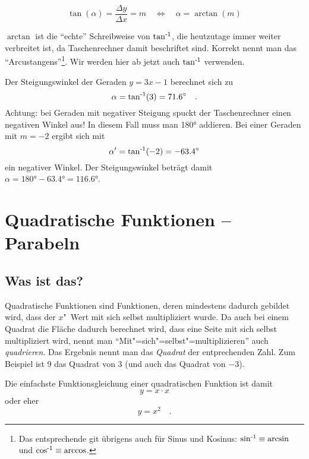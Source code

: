 \documentclass[load-fonts,babel=ngerman]{arbeitsblatt}
\begin{document}
\begin{equation}
  \label{eq:steigungswinkel}
  \tan(\alpha) = \frac{\Delta y}{\Delta x} = m
  \quad \Leftrightarrow \quad
  \alpha = \arctan(m)
\end{equation}

$\arctan$ ist die "`echte"' Schreibweise von $\operatorname{tan^{-1}}$, die heutzutage immer
weiter verbreitet ist, da Taschenrechner damit beschriftet sind.  Korrekt
nennt man das "`Arcustangens"'\footnote{Das entsprechende git übrigens auch
  für Sinus und Kosinus: $\operatorname{sin^{-1}}\equiv\arcsin$ und $\operatorname{cos^{-1}}\equiv\arccos$.}.  Wir
werden hier ab jetzt auch $\operatorname{tan^{-1}}$ verwenden.

\begin{beispiel}\label{bsp:steigungswinkel}
  Der Steigungswinkel der Geraden $y=3x-1$ berechnet sich zu
  \begin{equation*}
    \alpha = \operatorname{tan^{-1}}(3) = \ang{71.6} \quad.
  \end{equation*}
  Achtung: bei Geraden mit negativer Steigung spuckt der Taschenrechner einen
  negativen Winkel aus!  In diesem Fall muss man \ang{180} addieren.  Bei
  einer Geraden mit $m=-2$ ergibt sich mit
  \begin{equation*}
    \alpha' = \operatorname{tan^{-1}}(-2) = \ang{-63.4}
  \end{equation*}
  ein negativer Winkel.  Der Steigungswinkel beträgt damit $\alpha=\ang{180} -
  \ang{63.4} = \ang{116.6}$.
\end{beispiel}

\section{Quadratische Funktionen -- Parabeln}\label{sec:quadr-funkt-parab}
\subsection{Was ist das?}
Quadratische Funktionen sind Funktionen, deren 
mindestens dadurch gebildet wird, dass der $x$"~Wert mit sich selbst
multipliziert wurde.  Da auch bei einem Quadrat die Fläche dadurch berechnet
wird, dass eine Seite mit sich selbst multipliziert wird, nennt man
"`Mit"=sich"=selbst"=multiplizieren"' auch \emph{quadrieren}.  Das Ergebnis
nennt man das \emph{Quadrat} der entprechenden Zahl.  Zum Beispiel ist \num{9}
das Quadrat von \num{3} (und auch das Quadrat von \num{-3}).

Die einfachste Funktionsgleichung einer quadratischen Funktion ist damit
\begin{equation}
  \label{eq:quadr-funkt-simpel}
  y = x\cdot x
\end{equation}
oder eher
\begin{equation}
  \label{eq:quadr-funkt-basis}
  y = x^2 \quad.
\end{equation}
\end{document}
